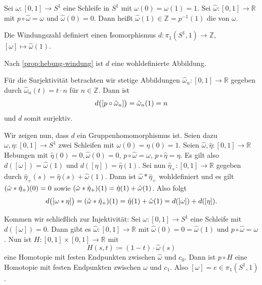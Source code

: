 \noindent\begin{minipage}{.85\textwidth}
	\begin{definition}[{name=[Windungszahl]}]
		Sei $\omega \colon [0,1] \to S^1$ eine Schleife in $S^1$ mit $\omega(0) = \omega(1) = 1$. Sei $\hat{\omega} : [0,1] \to \mathbb{R}$ mit $p \circ  \hat{\omega} = \omega$ und $\hat{\omega}(0)=0$. 
		Dann heißt $\hat{\omega}(1) \in \mathbb{Z} = p^{-1}(1)$ die  von $\omega$.
	\end{definition}

	\begin{satz}[{name=[Windungszahl definiert Isomorphismus der Fundamentalgruppe]}]
		Die Windungszahl definiert einen Isomorphismus $d \colon \pi_1(S^1,1) \to \mathbb{Z}$, $[\omega] \mapsto \hat{\omega}(1)$.
	\end{satz}
	\begin{beweis}
		Nach \cref{prop:hebung-windung} ist $d$ eine wohldefinierte Abbildung.
	
		Für die Surjektivität betrachten wir stetige Abbildungen $\hat{\omega}_n : [0,1] \to \mathbb{R}$ gegeben durch $\hat{\omega}_n (t) = t \cdot n$ für $n \in \mathbb{Z}$.
		Dann ist
		\[
			d \enbrace[\big]{ \benbrace*{p \circ  \hat{\omega}_n}} = \hat{\omega}_n(1) = n 
		\]
		und $d$ somit surjektiv.
	
		Wir zeigen nun, dass $d$ ein Gruppenhomomorphismus ist.
		Seien dazu $\omega, \eta \colon [0,1] \to S^1$ zwei Schleifen mit $\omega(0)= \eta(0) = 1$.
		Seien $\hat{\omega}, \hat{\eta} \colon [0,1] \to \mathbb{R}$ Hebungen mit $\hat{\eta}(0)=0, \hat{\omega}(0)=0$, $p \circ  \hat{\omega} = \omega$, $p \circ \hat{\eta} = \eta$.
		Es gilt also $d( [\omega]) = \hat{\omega}(1)$ und $d([\eta]) = \hat{\eta}(1)$.
		Sei nun $\hat{\eta}_+ \colon [0,1] \to \mathbb{R}$ gegeben durch $\hat{\eta}_+ (s) = \hat{\eta}(s) + \hat{\omega}(1)$.
		Dann ist $\hat{\omega} * \hat{\eta}_+$ wohldefiniert und es gilt $\enbrace*{\hat{\omega} * \hat{\eta}_+}(0) = 0 $ sowie $\enbrace*{\hat{\omega} * \hat{\eta}_+}(1) = \hat{\eta}(1) + \hat{\omega}(1)$.
		Also folgt
		\[
			d \enbrace[\big]{[\omega * \eta]} = \enbrace*{ \hat{\omega} * \hat{\eta}_+} (1) = \hat{\eta}(1) + \hat{\omega}(1) = d([\omega]) + d([\eta]).
		\]
	
		Kommen wir schließlich zur Injektivität:
		Sei $\omega \colon [0,1] \to S^1$ eine Schleife mit $d([\omega]) = 0$.
		Dann gibt es $\hat{\omega} \colon [0,1] \to \mathbb{R}$ mit $\hat{\omega}(0)= 0 = \hat{\omega}(1)$ und $p \circ  \hat{\omega} = \omega$.
		Nun ist $H \colon [0,1] \times [0,1] \to \mathbb{R}$ mit 
		\[
			H (s,t) \coloneqq (1-t)\cdot  \hat{\omega}(s)
		\]
		eine Homotopie mit festen Endpunkten zwischen $\hat{\omega}$ und $c_0$.
		Dann ist $p \circ H$ eine Homotopie mit festen Endpunkten zwischen $\omega$ und $c_1$.
		Also $[\omega] = e \in \pi_1(S^1,1)$.
	\end{beweis}
\end{minipage}%
